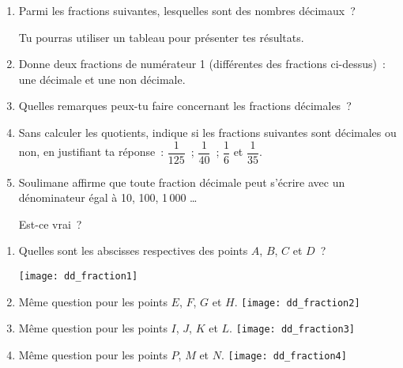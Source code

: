 \begin{exercice}
\begin{enumerate}
 \item Parmi les fractions suivantes, lesquelles sont des nombres décimaux ?
Tu pourras utiliser un tableau pour présenter tes résultats.
 \item Donne deux fractions de numérateur 1 (différentes des fractions ci-dessus) : une  décimale et une non décimale.
 \item Quelles remarques peux-tu faire concernant les fractions décimales ?
 \item Sans calculer les quotients, indique si les fractions suivantes sont décimales ou non, en justifiant ta réponse : $\dfrac{1}{125}$ ; $\dfrac{1}{40}$ ; $\dfrac{1}{6}$ et $\dfrac{1}{35}$.
 \vspace{0.2cm}
 \item Soulimane affirme que toute fraction décimale peut s'écrire avec un dénominateur égal à 10, 100, 1\,000 \ldots
 
 Est-ce vrai ?
 \end{enumerate}
\end{exercice}


\begin{exercice}
\begin{enumerate}
 \item Quelles sont les abscisses respectives des points $A$, $B$, $C$ et $D$ ?
 
 \texttt{[image: dd\_fraction1]}
 \item Même question pour les points $E$, $F$, $G$ et $H$.
 \texttt{[image: dd\_fraction2]}
 \item Même question pour les points $I$, $J$, $K$ et $L$.
 \texttt{[image: dd\_fraction3]}
 \item Même question pour les points $P$, $M$ et $N$.
 \texttt{[image: dd\_fraction4]}
 \end{enumerate}
\end{exercice}


